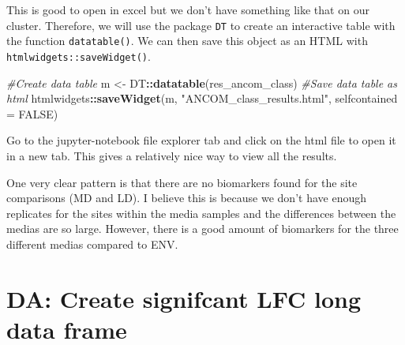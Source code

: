 \documentclass[
]{book}
\newenvironment{Shaded}{\begin{snugshade}}{\end{snugshade}}
\newcommand{\AttributeTok}[1]{\textcolor[rgb]{0.13,0.29,0.53}{#1}}
\newcommand{\CommentTok}[1]{\textcolor[rgb]{0.56,0.35,0.01}{\textit{#1}}}
\newcommand{\ConstantTok}[1]{\textcolor[rgb]{0.56,0.35,0.01}{#1}}
\newcommand{\FunctionTok}[1]{\textcolor[rgb]{0.13,0.29,0.53}{\textbf{#1}}}
\newcommand{\NormalTok}[1]{#1}
\newcommand{\OtherTok}[1]{\textcolor[rgb]{0.56,0.35,0.01}{#1}}
\newcommand{\SpecialCharTok}[1]{\textcolor[rgb]{0.81,0.36,0.00}{\textbf{#1}}}
\newcommand{\StringTok}[1]{\textcolor[rgb]{0.31,0.60,0.02}{#1}}
\begin{document}
This is good to open in excel but we don't have something like that on our cluster.
Therefore, we will use the package \texttt{DT} to create an interactive table with the function \texttt{datatable()}.
We can then save this object as an HTML with \texttt{htmlwidgets::saveWidget()}.

\begin{Shaded}
\begin{Highlighting}[]
\CommentTok{\#Create data table}
\NormalTok{m }\OtherTok{\textless{}{-}}\NormalTok{ DT}\SpecialCharTok{::}\FunctionTok{datatable}\NormalTok{(res\_ancom\_class)}
\CommentTok{\#Save data table as html}
\NormalTok{htmlwidgets}\SpecialCharTok{::}\FunctionTok{saveWidget}\NormalTok{(m, }\StringTok{"ANCOM\_class\_results.html"}\NormalTok{, }\AttributeTok{selfcontained =} \ConstantTok{FALSE}\NormalTok{)}
\end{Highlighting}
\end{Shaded}

Go to the jupyter-notebook file explorer tab and click on the html file to open it in a new tab.
This gives a relatively nice way to view all the results.

One very clear pattern is that there are no biomarkers found for the site comparisons (MD and LD).
I believe this is because we don't have enough replicates for the sites within the media samples and the differences between the medias are so large.
However, there is a good amount of biomarkers for the three different medias compared to ENV.

\hypertarget{da-create-signifcant-lfc-long-data-frame}{%
\section{DA: Create signifcant LFC long data frame}\label{da-create-signifcant-lfc-long-data-frame}}
\end{document}
